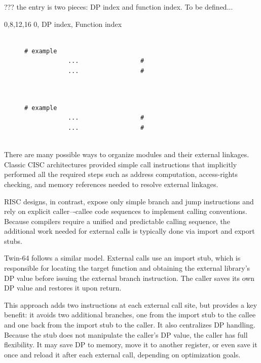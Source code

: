 ??? the entry is two pieces: DP index and function index. To be defined...
\begin{center}
    \drawInstrFormatSixtyFour
       {0,8,12,16}
        {0, DP index, Function index}
\end{center}


\begin{figure}[H]
\centering
\lstset{style=codesnippetstyle}
\begin{lstlisting}

# example
			...					# 
			...					# 
		
\end{lstlisting}
\end{figure}





\begin{figure}[H]
\centering
\lstset{style=codesnippetstyle}
\begin{lstlisting}

# example
			...					# 
			...					# 
		
\end{lstlisting}
\end{figure}



There are many possible ways to organize modules and their external linkages. Classic CISC architectures provided simple call instructions that implicitly performed all the required steps such as address computation, access-rights checking, and memory references needed to resolve external linkages.

RISC designs, in contrast, expose only simple branch and jump instructions and rely on explicit caller–-callee code sequences to implement calling conventions. Because compilers require a unified and predictable calling sequence, the additional work needed for external calls is typically done via import and export stubs.

Twin-64 follows a similar model. External calls use an import stub, which is responsible for locating the target function and obtaining the external library’s DP value before issuing the external branch instruction. The caller saves its own DP value and restores it upon return.

This approach adds two instructions at each external call site, but provides a key benefit: it avoids two additional branches, one from the import stub to the callee and one back from the import stub to the caller. It also centralizes DP handling. Because the stub does not manipulate the caller’s DP value, the caller has full flexibility. It may save DP to memory, move it to another register, or even save it once and reload it after each external call, depending on optimization goals.

